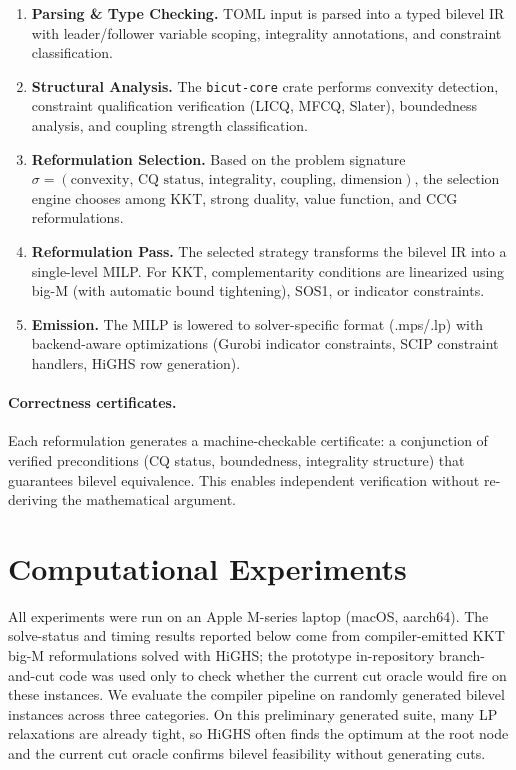 \documentclass[11pt]{article}
\begin{document}
\begin{enumerate}
\item \textbf{Parsing \& Type Checking.} TOML input is parsed into a typed
  bilevel IR with leader/follower variable scoping, integrality annotations,
  and constraint classification.

\item \textbf{Structural Analysis.} The \texttt{bicut-core} crate performs
  convexity detection, constraint qualification verification (LICQ, MFCQ,
  Slater), boundedness analysis, and coupling strength classification.

\item \textbf{Reformulation Selection.} Based on the problem signature
  $\sigma = (\text{convexity, CQ status, integrality, coupling, dimension})$,
  the selection engine chooses among KKT, strong duality, value function,
  and CCG reformulations.

\item \textbf{Reformulation Pass.} The selected strategy transforms the bilevel
  IR into a single-level MILP. For KKT, complementarity conditions are
  linearized using big-M (with automatic bound tightening), SOS1, or
  indicator constraints.

\item \textbf{Emission.} The MILP is lowered to solver-specific format
  (.mps/.lp) with backend-aware optimizations (Gurobi indicator constraints,
  SCIP constraint handlers, HiGHS row generation).
\end{enumerate}

\paragraph{Correctness certificates.}
Each reformulation generates a machine-checkable certificate: a conjunction
of verified preconditions (CQ status, boundedness, integrality structure)
that guarantees bilevel equivalence. This enables independent verification
without re-deriving the mathematical argument.

\section{Computational Experiments}
\label{sec:experiments}

All experiments were run on an Apple M-series laptop (macOS, aarch64).
The solve-status and timing results reported below come from compiler-emitted
KKT big-M reformulations solved with HiGHS; the prototype in-repository
branch-and-cut code was used only to check whether the current cut oracle
would fire on these instances. We evaluate the compiler pipeline on
randomly generated bilevel instances across three categories. On this
preliminary generated suite, many LP relaxations are already tight, so
HiGHS often finds the optimum at the root node and the current cut oracle
confirms bilevel feasibility without generating cuts.
\end{document}
